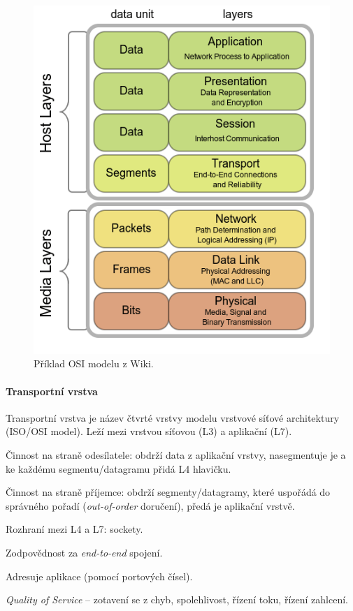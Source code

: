 \begin{figure}[H]
    \centering
    \includegraphics[width=0.65\linewidth]{osi_model_wiki.png}
    \caption{Příklad OSI modelu z Wiki.}
\end{figure}

\paragraph*{Transportní vrstva} Transportní vrstva je název čtvrté vrstvy modelu vrstvové síťové architektury (ISO/OSI model). Leží mezi vrstvou síťovou (L3) a aplikační (L7). \begin{compactitem}
    \item Činnost na straně odesílatele: obdrží data z aplikační vrstvy, nasegmentuje je a ke každému segmentu/datagramu přidá L4 hlavičku.
    \item Činnost na straně příjemce: obdrží segmenty/datagramy, které uspořádá do správného pořadí (\textit{out-of-order} doručení), předá je aplikační vrstvě.
    \item Rozhraní mezi L4 a L7: sockety.
    \item Zodpovědnost za \textit{end-to-end} spojení.
    \item Adresuje aplikace (pomocí portových čísel).
    \item \textit{Quality of Service} -- zotavení se z chyb, spolehlivost, řízení toku, řízení zahlcení.
\end{compactitem}

